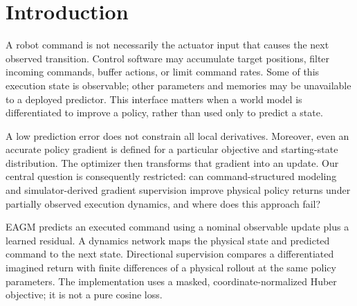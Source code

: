 \begin{abstract}
Robot world models receive policy commands, while physical transitions are driven by commands transformed by execution software. Hidden controller memory can therefore affect both prediction and the gradients used for policy optimization. We study EAGM, which combines a structured observable-command bottleneck with finite-difference policy-gradient supervision. In a fixed, partially unknown execution-controller setting, independent five-seed experiments support improved physical tracking returns over a matched model without directional supervision, including a simulator-budget control. These benefits do not establish general robot-task transfer. A true end-effector reaching evaluation fails to reproduce the benefit. Frozen-model interventions show that correcting reward geometry alone is insufficient, whereas replacing transition derivatives restores gradient alignment. Subsequent optimizer and start-distribution checks nevertheless fail joint held-out improvement criteria. The results distinguish prediction accuracy, gradient accuracy, and physical update utility, and identify the scope and remaining limitations of execution-aware supervision.
\end{abstract}
\section{Introduction}
A robot command is not necessarily the actuator input that causes the next observed transition. Control software may accumulate target positions, filter incoming commands, buffer actions, or limit command rates. Some of this execution state is observable; other parameters and memories may be unavailable to a deployed predictor. This interface matters when a world model is differentiated to improve a policy, rather than used only to predict a state.

A low prediction error does not constrain all local derivatives. Moreover, even an accurate policy gradient is defined for a particular objective and starting-state distribution. The optimizer then transforms that gradient into an update. Our central question is consequently restricted: can command-structured modeling and simulator-derived gradient supervision improve physical policy returns under partially observed execution dynamics, and where does this approach fail?

EAGM predicts an executed command using a nominal observable update plus a learned residual. A dynamics network maps the physical state and predicted command to the next state. Directional supervision compares a differentiated imagined return with finite differences of a physical rollout at the same policy parameters. The implementation uses a masked, coordinate-normalized Huber objective; it is not a pure cosine loss.

